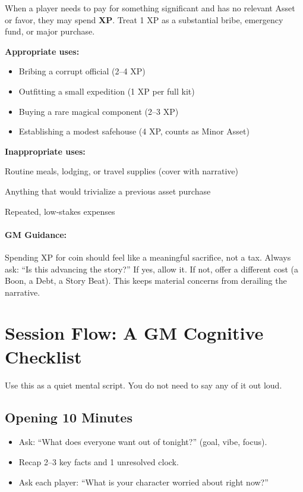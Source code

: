 When a player needs to pay for something significant and has no relevant Asset or favor, they may spend \textbf{XP}. Treat 1 XP as a substantial bribe, emergency fund, or major purchase.

\begin{tcolorbox}[title=When to Use XP for Coin, colback=white!97!gray, colframe=black!80!gray]
\textbf{Appropriate uses:}
\begin{itemize}
\item Bribing a corrupt official (2–4 XP)
\item Outfitting a small expedition (1 XP per full kit)
\item Buying a rare magical component (2–3 XP)
\item Establishing a modest safehouse (4 XP, counts as Minor Asset)
\end{itemize}
\textbf{Inappropriate uses:}
\item Routine meals, lodging, or travel supplies (cover with narrative)
\item Anything that would trivialize a previous asset purchase
\item Repeated, low‑stakes expenses
\end{tcolorbox}

\paragraph{GM Guidance:}
Spending XP for coin should feel like a meaningful sacrifice, not a tax. Always ask: “Is this advancing the story?” If yes, allow it. If not, offer a different cost (a Boon, a Debt, a Story Beat). This keeps material concerns from derailing the narrative.

\section{Session Flow: A GM Cognitive Checklist}
\label{sec:session-flow}

Use this as a quiet mental script. You do not need to say any of it out loud.

\subsection{Opening 10 Minutes}
\label{subsec:opening-10}
\begin{itemize}
\item Ask: “What does everyone want out of tonight?” (goal, vibe, focus).
\item Recap 2–3 key facts and 1 unresolved clock.
\item Ask each player: “What is your character worried about right now?”
\end{itemize}

